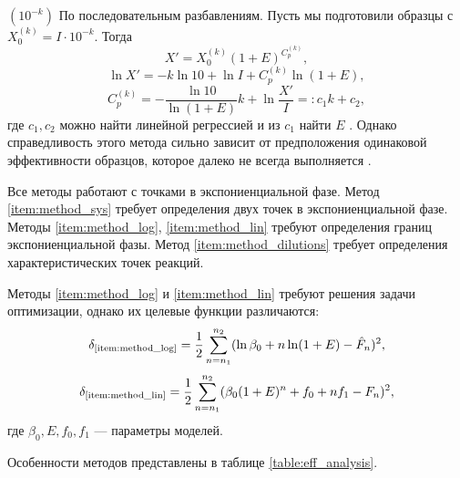 \begin{labeldesc}
  \item[$(10^{-k})$]\label{item:method_dilutions}
  По последовательным разбавлениям. Пусть мы подготовили образцы с
  $X_0^{(k)}=I\cdot 10^{-k}$. Тогда
  \[
    X'=X_0^{(k)}(1+E)^{C_{p}^{(k)}},
  \]
  \[
    \ln X' = -k\ln 10 + \ln I + C_{p}^{(k)}\ln (1+E),
  \]
  \[
    C_{p}^{(k)}=-\frac{\ln 10}{\ln (1+E)}k+\ln\frac{X'}{I}=:c_1 k+c_2,
  \]
  где $c_1,c_2$ можно найти линейной регрессией и из $c_1$ найти $E$
  \cite{rasmussenQuantificationLightCycler2001}. Однако справедливость
  этого метода сильно зависит от предположения одинаковой эффективности
  образцов, которое далеко не всегда выполняется
  \cite{ramakersAssumptionfreeAnalysisQuantitative2003}.
\end{labeldesc}

Все методы работают с точками в экспониенциальной фазе. Метод
\ref{item:method_sys} требует определения двух точек в экспониенциальной фазе.
Методы \ref{item:method_log}, \ref{item:method_lin} требуют определения границ
экспониенциальной фазы. Метод \ref{item:method_dilutions} требует определения
характеристических точек реакций.

Методы \ref{item:method_log} и \ref{item:method_lin} требуют решения задачи
оптимизации, однако их целевые функции различаются:
\[
  \delta_{\text{\ref{item:method_log}}}=\frac{1}{2}\sum_{n=n_1}^{n_2}(\ln \beta_0+n\ln(1+E)-\hat F_{n})^{2},
\]
\[
  \delta_{\text{\ref{item:method_lin}}}=\frac{1}{2}\sum_{n=n_1}^{n_2}(\beta_0(1+E)^{n}+f_0+nf_1-F_{n})^{2},
\]
где $\beta_0,E,f_0,f_1$ --- параметры моделей.

Особенности методов представлены в таблице \ref{table:eff_analysis}.

